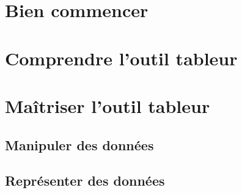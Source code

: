 \section{Bien commencer}


\section{Comprendre l'outil tableur}


\section{Maîtriser l'outil tableur}
\subsection{Manipuler des données}

\newpage
\subsection{Représenter des données}
